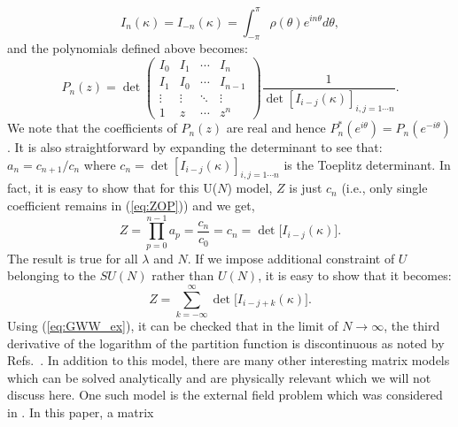\documentclass[letter,11pt]{article}
\begin{document}
\begin{equation}
	I_{n}(\kappa) = I_{-n}(\kappa) = \int_{-\pi}^{\pi} \rho(\theta) e^{i n \theta}d\theta, 
\end{equation}
and the polynomials defined above becomes:
\begin{equation}
	P_{n}(z) = \det
	\begin{pmatrix}
		I_0 & I_1 & \cdots & I_n \\
		I_1 & I_0 & \cdots & I_{n-1} \\
		\vdots  & \vdots  & \ddots & \vdots  \\
		1 & z & \cdots & z^n 
			\end{pmatrix}
		 \frac{1}{\det [I_{i-j} (\kappa)]_{i,j = 1 \cdots n}}. 
\end{equation}
We note that the coefficients of $P_{n}(z)$ are real and hence $P_{n}^{*}(e^{i\theta}) = P_{n}(e^{-i\theta})$. It is also straightforward by expanding the determinant to see that: $a_{n} = c_{n+1}/c_{n}$ where $c_{n} = \det [I_{i-j}(\kappa)]_{i,j = 1 \cdots n}$ is the Toeplitz determinant. 
In fact, it is easy to show that for this U($N$) model, $Z$ is just $c_{n}$ (i.e., only single coefficient remains in (\ref{eq:ZOP})) and we get, 
\begin{equation}
\label{eq:GWW_ex} 
Z = \prod_{p=0}^{n-1} a_{p} = \frac{c_n}{c_0} = c_{n} = \det \Big[I_{i-j}(\kappa) \Big].
\end{equation}
The result is true for all $\lambda$ and $N$. If we impose additional constraint of 
$U$ belonging to the $SU(N)$ rather than $U(N)$, it is easy to show that
it becomes:
\begin{equation}
\label{eq:GWW_ex2} 
Z = \sum_{k=-\infty}^{\infty} \det \Big[I_{i-j+k}(\kappa) \Big].
\end{equation}
Using (\ref{eq:GWW_ex}), it can be checked that in the limit of $N \to \infty$, the third derivative of the logarithm of the partition function is discontinuous as noted by Refs.~\cite{Gross:1980he, Wadia:2012fr}.
In addition to this model, there are many other interesting matrix models which can be solved analytically
and are physically relevant which we will not discuss here. 
One such model is the external field problem which was considered in \cite{Brezin:1980rk}. In this paper, a matrix 
\end{document}
